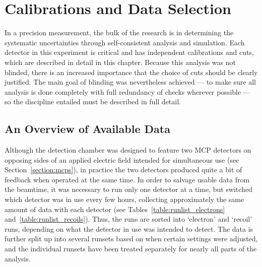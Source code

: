 %
%
%
\clearpage
\chapter{Calibrations and Data Selection}
\label{calibrations_chapter}
\label{dataselection_chapter}
In a precision measurement, the bulk of the research is in determining the systematic uncertainties through self-consistent analysis and simulation.  Each detector in this experiment is critical and has independent calibrations and cuts, which are described in detail in this chapter.  Because this analysis was not blinded, there is an increased importance that the choice of cuts should be clearly justified.  The main goal of blinding was nevertheless achieved --- to make sure all analysis is done completely with full redundancy of checks wherever possible --- so the discipline entailed must be described in full detail.
 

\section{An Overview of Available Data}
\label{sec:data_overview}
Although the detection chamber was designed to feature two MCP detectors on opposing sides of an applied electric field intended for simultaneous use (see Section~\ref{section:mcps}), in practice the two detectors produced quite a bit of feedback when operated at the same time.  In order to salvage usable data from the beamtime, it was necessary to run only one detector at a time, but switched which detector was in use every few hours, collecting approximately the same amount of data with each detector (see Tables~\ref{table:runlist_electrons} and~\ref{table:runlist_recoils}).  Thus, the runs are sorted into `electron' and `recoil' runs, depending on what the detector in use was intended to detect.  The data is further split up into several runsets based on when certain settings were adjusted, and the individual runsets have been treated separately for nearly all parts of the analysis.  


